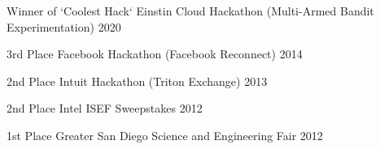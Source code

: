 

\begin{cvhonors}
  \cvhonor
    {Winner of `Coolest Hack`} %
    {Einstin Cloud Hackathon (Multi-Armed Bandit Experimentation)} %
    {} %
    {2020} %

  \cvhonor
    {3rd Place} %
    {Facebook Hackathon (Facebook Reconnect)} %
    {} %
    {2014} %

  \cvhonor
    {2nd Place} %
    {Intuit Hackathon (Triton Exchange)} %
    {} %
    {2013} %

  \cvhonor
    {2nd Place} %
    {Intel ISEF Sweepstakes} %
    {} %
    {2012} %

  \cvhonor
    {1st Place} %
    {Greater San Diego Science and Engineering Fair} %
    {} %
    {2012} %

\end{cvhonors}
